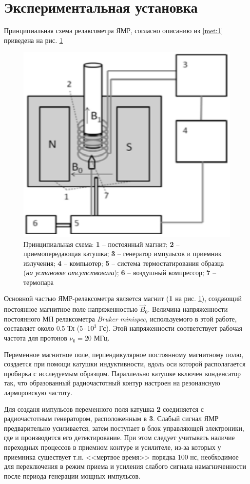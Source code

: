 \section{Экспериментальная установка}
Принципиальная схема релаксометра ЯМР, согласно описанию из \ref{met:1} приведена на рис. \ref{fig:installation}

\begin{figure}[h]
	\centering
	\includegraphics[width=0.6\linewidth]{Installation}
	\caption{Принципиальная схема: \textbf{1} -- постоянный магнит; \textbf{2} -- приемопередающая катушка; \textbf{3} -- генератор импульсов и приемник излучения; \textbf{4} -- компьютер; \textbf{5} -- система термостатирования образца (\textit{на установке отсутствовала}); \textbf{6} -- воздушный компрессор; \textbf{7} -- термопара}
	\label{fig:installation}
\end{figure}

Основной частью ЯМР-релаксометра является магнит (\textbf{1} на рис. \ref{fig:installation}), создающий постоянное магнитное поле напряженностью $ \vec{B}_0 $. Величина напряженности постоянного МП релаксометра \textit{Bruker minispec}, используемого в этой работе, составляет около $ 0.5 $ Тл ($ 5 \cdot 10^3 $ Гс). Этой напряженности соответствует рабочая частота для протонов $ \nu_0 = 20 $ МГц.

Переменное магнитное поле, перпендикулярное постоянному магнитному полю, создается при помощи катушки индуктивности, вдоль оси которой располагается пробирка с исследуемым образцом. Параллельно катушке включен конденсатор так, что образованный радиочастотный контур настроен на резонансную ларморовскую частоту.

Для созданя импульсов переменного поля катушка \textbf{2} соединяется с радиочастотным генератором, расположенным в \textbf{3}. Слабый сигнал ЯМР предварительно усиливается, затем поступает в блок управляющей электроники, где и производится его детектирование. При этом следует учитывать наличие переходных процессов в приемном контуре и усилителе, из-за которых у приемника существует т.н. <<мертвое время>> порядка 100 нс, необходимое для переключения в режим приема и усиления слабого сигнала намагниченности после периода генерации мощных импульсов.

